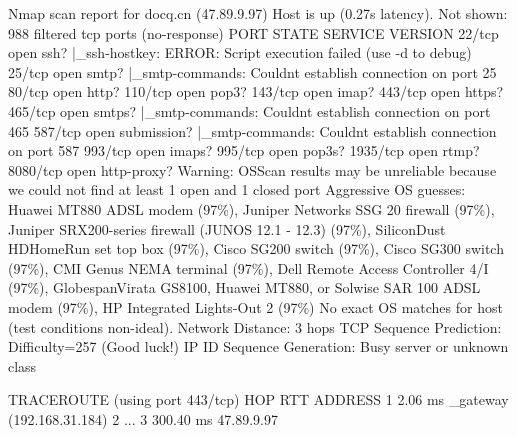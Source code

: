 \documentclass[
]{article}
\newenvironment{Shaded}{}{}
\newcommand{\NormalTok}[1]{#1}
\begin{document}
\begin{Shaded}
\begin{Highlighting}[]
\NormalTok{Nmap scan report for docq.cn (47.89.9.97)}
\NormalTok{Host is up (0.27s latency).}
\NormalTok{Not shown: 988 filtered tcp ports (no{-}response)}
\NormalTok{PORT     STATE SERVICE     VERSION}
\NormalTok{22/tcp   open  ssh?}
\NormalTok{|\_ssh{-}hostkey: ERROR: Script execution failed (use {-}d to debug)}
\NormalTok{25/tcp   open  smtp?}
\NormalTok{|\_smtp{-}commands: Couldn\textquotesingle{}t establish connection on port 25}
\NormalTok{80/tcp   open  http?}
\NormalTok{110/tcp  open  pop3?}
\NormalTok{143/tcp  open  imap?}
\NormalTok{443/tcp  open  https?}
\NormalTok{465/tcp  open  smtps?}
\NormalTok{|\_smtp{-}commands: Couldn\textquotesingle{}t establish connection on port 465}
\NormalTok{587/tcp  open  submission?}
\NormalTok{|\_smtp{-}commands: Couldn\textquotesingle{}t establish connection on port 587}
\NormalTok{993/tcp  open  imaps?}
\NormalTok{995/tcp  open  pop3s?}
\NormalTok{1935/tcp open  rtmp?}
\NormalTok{8080/tcp open  http{-}proxy?}
\NormalTok{Warning: OSScan results may be unreliable because we could not find at least 1 open and 1 closed port}
\NormalTok{Aggressive OS guesses: Huawei MT880 ADSL modem (97\%), Juniper Networks SSG 20 firewall (97\%), Juniper SRX200{-}series firewall (JUNOS 12.1 {-} 12.3) (97\%), SiliconDust HDHomeRun set top box (97\%), Cisco SG200 switch (97\%), Cisco SG300 switch (97\%), CMI Genus NEMA terminal (97\%), Dell Remote Access Controller 4/I (97\%), GlobespanVirata GS8100, Huawei MT880, or Solwise SAR 100 ADSL modem (97\%), HP Integrated Lights{-}Out 2 (97\%)}
\NormalTok{No exact OS matches for host (test conditions non{-}ideal).}
\NormalTok{Network Distance: 3 hops}
\NormalTok{TCP Sequence Prediction: Difficulty=257 (Good luck!)}
\NormalTok{IP ID Sequence Generation: Busy server or unknown class}

\NormalTok{TRACEROUTE (using port 443/tcp)}
\NormalTok{HOP RTT       ADDRESS}
\NormalTok{1   2.06 ms   \_gateway (192.168.31.184)}
\NormalTok{2   ...}
\NormalTok{3   300.40 ms 47.89.9.97}


\end{Highlighting}
\end{Shaded}
\end{document}
